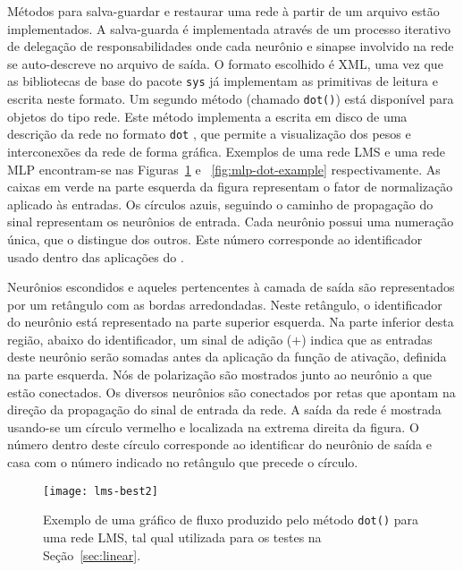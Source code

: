 Métodos para salva-guardar e restaurar uma rede à partir de um arquivo es\-tão
implementados. A salva-guarda é implementada através de um processo iterativo
de delegação de responsabilidades onde cada neurônio e sinapse involvido na
rede se auto-descreve no arquivo de saída. O formato escolhido é XML, uma vez
que as bibliotecas de base do pacote \texttt{sys} já implementam as primitivas
de leitura e escrita neste formato. Um segundo método (chamado \texttt{dot()})
está disponível para objetos do tipo rede. Este método implementa a
escrita em disco de uma descrição da rede no formato \texttt{dot}
\cite{graphviz}, que permite a visualização dos pesos e interconexões da rede
de forma gráfica. Exemplos de uma rede LMS e uma rede MLP encontram-se nas
Figuras~\ref{fig:lms-dot-example} e ~\ref{fig:mlp-dot-example}
respectivamente. As caixas em verde na parte esquerda da figura representam o
fator de normalização aplicado às entradas. Os círculos azuis, seguindo o
caminho de propagação do sinal representam os neurônios de entrada. Cada
neurônio possui uma numeração única, que o distingue dos outros. Este número
corresponde ao identificador usado dentro das aplicações do
. 

Neurônios escondidos e aqueles pertencentes à camada de saída são
representados por um retângulo com as bordas arredondadas. Neste retângulo, o
identificador do neurônio está representado na parte superior esquerda. Na
parte inferior desta região, abaixo do identificador, um sinal de adição ($+$)
indica que as entradas deste neurônio serão somadas antes da aplicação da
função de ativação, definida na parte esquerda. Nós de polarização são
mostrados junto ao neurônio a que estão conectados. Os diversos neurônios são
conectados por retas que apontam na direção da propagação do sinal de entrada
da rede. A saída da rede é mostrada usando-se um círculo vermelho e localizada
na extrema direita da figura. O número dentro deste círculo corresponde ao
identificar do neurônio de saída e casa com o número indicado no retângulo que
precede o círculo.

\begin{figure}
\begin{center}
\texttt{[image: lms-best2]}
\end{center}
\caption{Exemplo de uma gráfico de fluxo produzido pelo método \texttt{dot()}
para uma rede LMS, tal qual utilizada para os testes na Seção~\ref{sec:linear}.}
\label{fig:lms-dot-example}
\end{figure}


